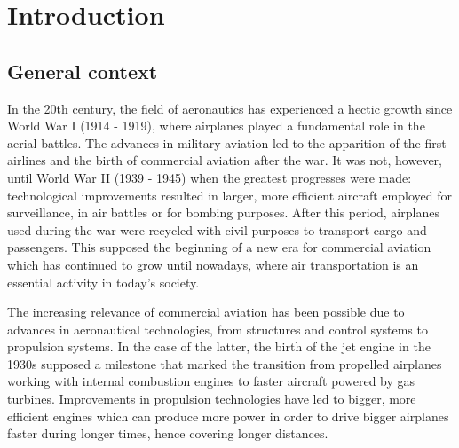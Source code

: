 \chapter{Introduction}

    

\section{General context}





In the 20th century, the field of aeronautics has experienced a hectic growth since World War I (1914 - 1919), where airplanes played a fundamental role in the aerial battles. The advances in military aviation led to the apparition of the first airlines and the birth of commercial aviation after the war. It was not, however, until World War II (1939 - 1945) when the greatest progresses were made: technological improvements resulted in larger, more efficient aircraft employed for surveillance, in air battles or for bombing purposes. After this period, airplanes used during the war were recycled with civil purposes to transport cargo and passengers. This supposed the beginning of a new era for commercial aviation which has continued to grow until nowadays, where air transportation is an essential activity in today's society.

The increasing relevance of commercial aviation has been possible due to advances in aeronautical technologies, from structures and control systems to propulsion systems. In the case of the latter, the birth of the jet engine in the 1930s supposed a milestone that marked the transition from propelled airplanes working with internal combustion engines to faster aircraft powered by gas turbines. Improvements in propulsion technologies have led to bigger, more efficient engines which can produce more power in order to drive bigger airplanes faster during longer times, hence covering longer distances. 


